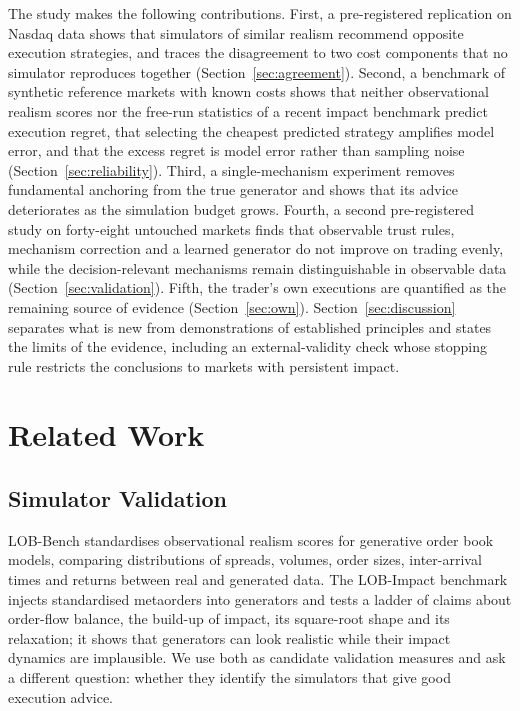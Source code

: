 \documentclass{ieeeaccess}
\begin{document}
The study makes the following contributions. First, a pre-registered replication on Nasdaq data shows that simulators of
similar realism recommend opposite execution strategies, and traces the disagreement to two cost components that no
simulator reproduces together (Section~\ref{sec:agreement}). Second, a benchmark of synthetic reference markets with
known costs shows that neither observational realism scores nor the free-run statistics of a recent impact benchmark
predict execution regret, that selecting the cheapest predicted strategy amplifies model error, and that the excess
regret is model error rather than sampling noise (Section~\ref{sec:reliability}). Third, a single-mechanism experiment
removes fundamental anchoring from the true generator and shows that its advice deteriorates as the simulation budget
grows. Fourth, a second pre-registered study on forty-eight untouched markets finds that observable trust rules,
mechanism correction and a learned generator do not improve on trading evenly, while the decision-relevant mechanisms
remain distinguishable in observable data (Section~\ref{sec:validation}). Fifth, the trader's own executions are
quantified as the remaining source of evidence (Section~\ref{sec:own}). Section~\ref{sec:discussion} separates what is new
from demonstrations of established principles and states the limits of the evidence, including an external-validity
check whose stopping rule restricts the conclusions to markets with persistent impact.

\section{Related Work}
\label{sec:related}

\subsection{Simulator Validation}
LOB-Bench \cite{nagy2025lobbench} standardises observational realism scores for generative order book models, comparing
distributions of spreads, volumes, order sizes, inter-arrival times and returns between real and generated data. The
LOB-Impact benchmark \cite{nigmatulin2026lobimpact} injects standardised metaorders into generators and tests a ladder of
claims about order-flow balance, the build-up of impact, its square-root shape and its relaxation; it shows that
generators can look realistic while their impact dynamics are implausible. We use both as candidate validation measures
and ask a different question: whether they identify the simulators that give good execution advice.
\end{document}
